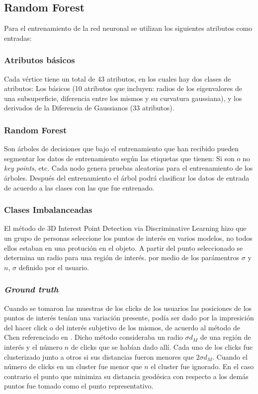 \documentclass[conference]{IEEEtran}
\begin{document}
\subsection{Random Forest}
Para el entrenamiento de la red neuronal se utilizan los siguientes atributos como entradas:

\subsubsection{Atributos básicos}
Cada vértice tiene un total de 43 atributos, en los cuales hay dos clases de atributos: Los básicos (10 atributos que incluyen: radios de los eigenvalores de una subsuperficie, diferencia entre los mismos y su curvatura gaussiana), y los derivados de la Diferencia de Gaussianos (33 atributos).

\subsubsection{Random Forest}
Son árboles de decisiones que bajo el entrenamiento que han recibido pueden segmentar los datos de entrenamiento según las etiquetas que tienen: Si son o no \textit{key points}, etc. Cada nodo genera pruebas aleatorias para el entrenamiento de los árboles. Después del entrenamiento el árbol podrá clasificar los datos de entrada de acuerdo a las clases con las que fue entrenado.

\subsubsection{Clases Imbalanceadas}
El método de 3D Interest Point Detection via Discriminative Learning hizo que un grupo de personas seleccione los puntos de interés en varios modelos, no todos ellos estaban en una protución en el objeto. A partir del punto seleccionado se determina un radio para una región de interés. por medio de los parámentros $\sigma$ y $n$, $\sigma$ definido por el usuario.

\subsubsection{\textit{Ground truth}}
Cuando se tomaron las muestras de los clicks de los usuarios las posiciones de los puntos de interés tenían una variación presente, podía ser dado por la impresición del hacer click o del interés subjetivo de los mismos, de acuerdo al método de Chen referenciado en \cite{forest}. Dicho método consideraba un radio $\sigma d_{M}$ de una región de interés y el número $n$ de clicks que se habían dado allí. Cada uno de los clicks fue clusterizado junto a otros si sus distancias fueron menores que $2 \sigma d_{M}$. Cuando el número de clicks en un cluster fue menor que $n$ el cluster fue ignorado. En el caso contrario el punto que minimiza su distancia geodésica con respecto a los demás puntos fue tomado como el punto representativo.
\end{document}
